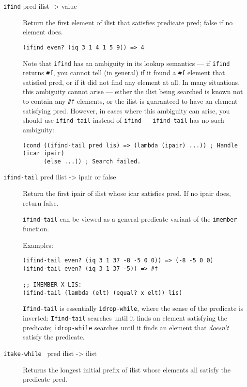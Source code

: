 \begin{description}
\item[ \href{}{} \texttt{ifind} pred ilist -\textgreater{} value ]
Return the first element of ilist that satisfies predicate pred; false
if no element does.

\begin{verbatim}
(ifind even? (iq 3 1 4 1 5 9)) => 4
\end{verbatim}

Note that \texttt{ifind} has an ambiguity in its lookup semantics --- if
\texttt{ifind} returns \texttt{\#f}, you cannot tell (in general) if it
found a \texttt{\#f} element that satisfied pred, or if it did not find
any element at all. In many situations, this ambiguity cannot arise ---
either the ilist being searched is known not to contain any \texttt{\#f}
elements, or the ilist is guaranteed to have an element satisfying pred.
However, in cases where this ambiguity can arise, you should use
\texttt{ifind-tail} instead of \texttt{ifind} --- \texttt{ifind-tail}
has no such ambiguity:

\begin{verbatim}
(cond ((ifind-tail pred lis) => (lambda (ipair) ...)) ; Handle (icar ipair)
      (else ...)) ; Search failed.
\end{verbatim}
\item[ \href{}{} \texttt{ifind-tail} pred ilist -\textgreater{} ipair or
false ]
Return the first ipair of ilist whose icar satisfies pred. If no ipair
does, return false.

\texttt{ifind-tail} can be viewed as a general-predicate variant of the
\texttt{imember} function.

Examples:

\begin{verbatim}
(ifind-tail even? (iq 3 1 37 -8 -5 0 0)) => (-8 -5 0 0)
(ifind-tail even? (iq 3 1 37 -5)) => #f

;; IMEMBER X LIS:
(ifind-tail (lambda (elt) (equal? x elt)) lis)
\end{verbatim}

\texttt{Ifind-tail} is essentially \texttt{idrop-while}, where the sense
of the predicate is inverted: \texttt{Ifind-tail} searches until it
finds an element satisfying the predicate; \texttt{idrop-while} searches
until it finds an element that \emph{doesn't} satisfy the predicate.
\item[ \href{}{} \texttt{itake-while~} pred ilist -\textgreater{} ilist
]
Returns the longest initial prefix of ilist whose elements all satisfy
the predicate pred.


\end{description}
